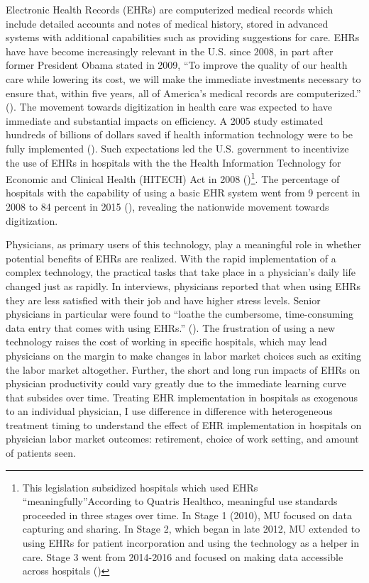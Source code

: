 \documentclass[11pt]{article}
\begin{document}
Electronic Health Records (EHRs) are computerized medical records which include detailed accounts and notes of medical history, stored in advanced systems with additional capabilities such as providing suggestions for care. EHRs have have become increasingly relevant in the U.S. since 2008, in part after former President Obama stated in 2009, “To improve the quality of our health care while lowering its cost, we will make the immediate investments necessary to ensure that, within five years, all of America’s medical records are computerized.” (\cite{presquote}). The movement towards digitization in health care was expected to have immediate and substantial impacts on efficiency. A 2005 study estimated hundreds of billions of dollars saved if health information technology were to be fully implemented (\cite{hillestad2005}). Such expectations led the U.S. government to incentivize the use of EHRs in hospitals with the the Health Information Technology for Economic and Clinical Health (HITECH) Act in 2008 (\cite{hitech})\footnote{This legislation subsidized hospitals which used EHRs “meaningfully”According to Quatris Healthco, meaningful use standards proceeded in three stages over time. In Stage 1 (2010), MU focused on data capturing and sharing. In Stage 2, which began in late 2012, MU extended to using EHRs for patient incorporation and using the technology as a helper in care. Stage 3 went from 2014-2016 and focused on making data accessible across hospitals (\cite{meanuse})}. The percentage of hospitals with the capability of using a basic EHR system went from 9 percent in 2008 to 84 percent in 2015 (\cite{stats}), revealing the nationwide movement towards digitization.

Physicians, as primary users of this technology, play a meaningful role in whether potential benefits of EHRs are realized. With the rapid implementation of a complex technology, the practical tasks that take place in a physician's daily life changed just as rapidly. In interviews, physicians reported that when using EHRs they are less satisfied with their job and have higher stress levels. Senior physicians in particular were found to “loathe the cumbersome, time-consuming data entry that comes with using EHRs.” (\cite{CollierBurnout}). The frustration of using a new technology raises the cost of working in specific hospitals, which may lead physicians on the margin to make changes in labor market choices such as exiting the labor market altogether. Further, the short and long run impacts of EHRs on physician productivity could vary greatly due to the immediate learning curve that subsides over time.  Treating EHR implementation in hospitals as exogenous to an individual physician, I use difference in difference with heterogeneous treatment timing to understand the effect of EHR implementation in hospitals on physician labor market outcomes: retirement, choice of work setting, and amount of patients seen.
\end{document}
